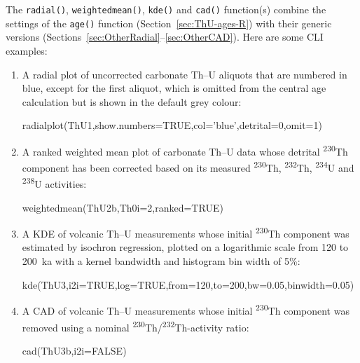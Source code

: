 \begin{refsection}
The \texttt{radial()}, \texttt{weightedmean()}, \texttt{kde()} and
\texttt{cad()} function(s) combine the settings of the \texttt{age()}
function (Section~\ref{sec:ThU-ages-R}) with their generic versions
(Sections~\ref{sec:OtherRadial}--\ref{sec:OtherCAD}). Here are some
CLI examples:

\begin{enumerate}

\item A radial plot of uncorrected carbonate Th--U aliquots that are
  numbered in blue, except for the first aliquot, which is omitted
  from the central age calculation but is shown in the default grey
  colour:
  
\begin{console}
radialplot(ThU1,show.numbers=TRUE,col='blue',detrital=0,omit=1)
\end{console}

\item A ranked weighted mean plot of carbonate Th--U data whose
  detrital \textsuperscript{230}Th component has been corrected based
  on its measured \textsuperscript{230}Th, \textsuperscript{232}Th,
  \textsuperscript{234}U and \textsuperscript{238}U activities:

\begin{console}
weightedmean(ThU2b,Th0i=2,ranked=TRUE)
\end{console}

\item A KDE of volcanic Th--U measurements whose initial
  \textsuperscript{230}Th component was estimated by isochron
  regression, plotted on a logarithmic scale from 120 to 200~ka with a
  kernel bandwidth and histogram bin width of 5\%:

\begin{console}
kde(ThU3,i2i=TRUE,log=TRUE,from=120,to=200,bw=0.05,binwidth=0.05)
\end{console}

\item A CAD of volcanic Th--U measurements whose initial
  \textsuperscript{230}Th component was removed using a nominal
  \textsuperscript{230}Th/\textsuperscript{232}Th-activity ratio:

\begin{console}
cad(ThU3b,i2i=FALSE)
\end{console}
  
\end{enumerate}

\printbibliography[heading=subbibliography]

\end{refsection}
